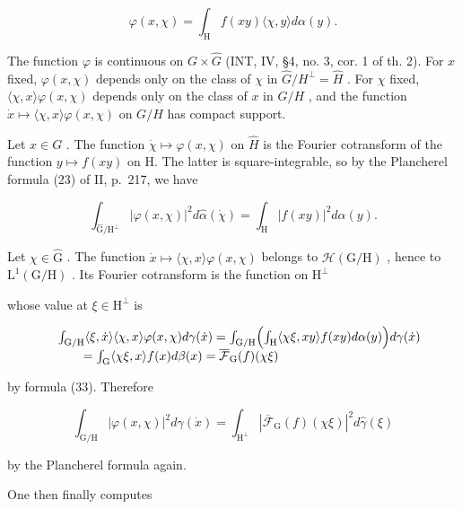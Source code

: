 \[
\varphi (x, \chi) = \int_ {\mathrm{H}} f (x y) \langle \chi , y \rangle d \alpha (y).
\]

The function \(\varphi\) is continuous on \(G \times \widehat{G}\) (INT, IV, §4, no. 3, cor. 1 of th. 2). For \(x\) fixed, \(\varphi(x, \chi)\) depends only on the class of \(\chi\) in \(\widehat{G}/H^{\perp} = \widehat{H}\) . For \(\chi\) fixed, \(\langle \chi, x \rangle \varphi(x, \chi)\) depends only on the class of \(x\) in \(G/H\) , and the function \(\dot{x} \mapsto \langle \chi, x \rangle \varphi(x, \chi)\) on \(G/H\) has compact support.

Let \(x \in G\) . The function \(\dot{\chi} \mapsto \varphi(x, \chi)\) on \(\hat{H}\) is the Fourier cotransform of the function \(y \mapsto f(xy)\) on H. The latter is square-integrable, so by the Plancherel formula (23) of II, p.~217, we have

\[
\int_ {\widehat {\mathrm{G}} / \mathrm{H} ^ {\perp}} | \varphi (x, \chi) | ^ {2} d \widehat {\alpha} (\dot {\chi}) = \int_ {\mathrm{H}} | f (x y) | ^ {2} d \alpha (y).\tag{35}
\]

 Let \(\chi\in\widehat{\mathrm{G}}\) . The function \(\dot{x}\mapsto\langle\chi,x\rangle\varphi(x,\chi)\) belongs to \(\mathcal{H}(\mathrm{G}/\mathrm{H})\) , hence to \(\mathrm{L}^{1}(\mathrm{G}/\mathrm{H})\) . Its Fourier cotransform is the function on \(\mathrm{H}^{\perp}\)

whose value at \(\xi\in\mathrm{H}^{\perp}\) is

\[
\begin{array}{r l} & {\int_ {\mathrm{G/H}} \langle \xi , \dot {x} \rangle \langle \chi , x \rangle \varphi (x, \chi) d \gamma (\dot {x}) = \int_ {\mathrm{G/H}} \Bigl (\int_ {\mathrm{H}} \langle \chi \xi , x y \rangle f (x y) d \alpha (y) \Bigr) d \gamma (\dot {x})} \\ & {\qquad = \int_ {\mathrm{G}} \langle \chi \xi , x \rangle f (x) d \beta (x) = \overline {{\mathcal {F}}} _ {\mathrm{G}} (f) (\chi \xi)} \end{array}
\]

by formula (33). Therefore

\[
\int_ {\mathrm{G/H}} | \varphi (x, \chi) | ^ {2} d \gamma (\dot {x}) = \int_ {\mathrm{H} ^ {\perp}} | \overline {{\mathcal {F}}} _ {\mathrm{G}} (f) (\chi \xi) | ^ {2} d \widehat {\gamma} (\xi)\tag{36}
\]

by the Plancherel formula again.

One then finally computes


